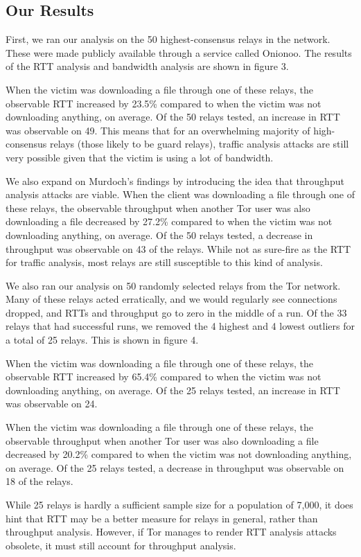 \documentclass[12pt,journal]{IEEEtran}
\begin{document}
\subsection{Our Results}
First, we ran our analysis on the 50 highest-consensus relays in the network. These were made publicly available through a service called Onionoo. The results of the RTT analysis and bandwidth analysis are shown in figure 3.
\par
When the victim was downloading a file through one of these relays, the observable RTT increased by 23.5\% compared to when the victim was not downloading anything, on average. Of the 50 relays tested, an increase in RTT was observable on 49. This means that for an overwhelming majority of high-consensus relays (those likely to be guard relays), traffic analysis attacks are still very possible given that the victim is using a lot of bandwidth.
\par
We also expand on Murdoch's findings by introducing the idea that throughput analysis attacks are viable. When the client was downloading a file through one of these relays, the observable throughput when another Tor user was also downloading a file decreased by 27.2\% compared to when the victim was not downloading anything, on average. Of the 50 relays tested, a decrease in throughput was observable on 43 of the relays. While not as sure-fire as the RTT for traffic analysis, most relays are still susceptible to this kind of analysis.

\par
We also ran our analysis on 50 randomly selected relays from the Tor network. Many of these relays acted erratically, and we would regularly see connections dropped, and RTTs and throughput go to zero in the middle of a run. Of the 33 relays that had successful runs, we removed the 4 highest and 4 lowest outliers for a total of 25 relays. This is shown in figure 4.
\par
When the victim was downloading a file through one of these relays, the observable RTT increased by 65.4\% compared to when the victim was not downloading anything, on average. Of the 25 relays tested, an increase in RTT was observable on 24.
\par
When the victim was downloading a file through one of these relays, the observable throughput when another Tor user was also downloading a file decreased by 20.2\% compared to when the victim was not downloading anything, on average. Of the 25 relays tested, a decrease in throughput was observable on 18 of the relays.
\par
While 25 relays is hardly a sufficient sample size for a population of 7,000, it does hint that RTT may be a better measure for relays in general, rather than throughput analysis. However, if Tor manages to render RTT analysis attacks obsolete, it must still account for throughput analysis.
\end{document}
